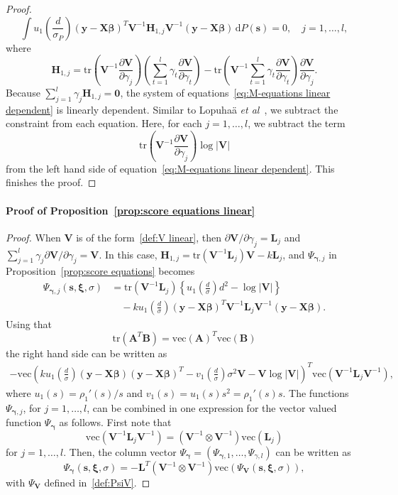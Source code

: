 \documentclass{article}
\numberwithin{equation}{section}
\theoremstyle{plain}
\newcommand{\dd}{\mathrm{d}}
\newcommand{\vc}{\mathrm{vec}}
\newcommand{\tr}{\mathrm{tr}}
\newcommand{\bbeta}{\bm\beta}
\newcommand{\bxi}{\bm\xi}
\newcommand{\bgamma}{\bm\gamma}
\newcommand{\by}{\mathbf{y}}
\newcommand{\bs}{\mathbf{s}}
\newcommand{\bX}{\mathbf{X}}
\newcommand{\bV}{\mathbf{V}}
\newcommand{\bA}{\mathbf{A}}
\newcommand{\bB}{\mathbf{B}}
\newcommand{\bL}{\mathbf{L}}
\newcommand{\bH}{\mathbf{H}}
\begin{document}
\begin{proof}
\begin{equation}
\int
u_1\left(\frac{d}{\sigma_P}\right)
(\by-\bX\bbeta)^T\bV^{-1}
\bH_{1,j}
\bV^{-1}(\by-\bX\bbeta)
\,\dd P(\mathbf{s})
=0,
\quad
j=1,\ldots,l,
\end{equation}
where
\[
\bH_{1,j}
=
\mathrm{tr}\left(\bV^{-1}\frac{\partial \bV}{\partial \gamma_j}\right)
\left(
\sum_{t=1}^l\gamma_t\frac{\partial \bV}{\partial \gamma_t}
\right)
-
\mathrm{tr}\left(\bV^{-1}\sum_{t=1}^l\gamma_t\frac{\partial \bV}{\partial \gamma_t}\right)
\frac{\partial \bV}{\partial \gamma_j}.
\]
Because $\sum_{j=1}^l \gamma_j\bH_{1,j}=\mathbf{0}$, the system of equations~\eqref{eq:M-equations linear dependent} is linearly dependent.
Similar to Lopuha\"a \textit{et al}~\cite{lopuhaa-gares-ruizgazen2023}, we subtract the constraint from each equation.
Here, for each $j=1,\ldots,l$, we subtract the term
\[
\mathrm{tr}\left(\bV^{-1}\frac{\partial \bV}{\partial \gamma_j}\right)
\log|\bV|
\]
from the left hand side of equation~\eqref{eq:M-equations linear dependent}.
This finishes the proof.
\end{proof}

\paragraph*{Proof of Proposition~\ref{prop:score equations linear}}
\begin{proof}
When $\bV$ is of the form~\eqref{def:V linear}, then $\partial\bV/\partial\gamma_j=\bL_j$
and $\sum_{j=1}^l\gamma_j \partial\bV/\partial\gamma_j=\bV$.
In this case, 
$\bH_{1,j}=
\mathrm{tr}\left(\bV^{-1}\bL_j\right)\bV
-
k\bL_j$,
and $\Psi_{\bgamma,j}$ in Proposition~\ref{prop:score equations} becomes
\[
\begin{split}
\Psi_{\bgamma,j}(\bs,\bxi,\sigma)
&=
\mathrm{tr}\left(\bV^{-1}\bL_j\right)
\left\{
u_1\left(\frac{d}{\sigma}\right)d^2-\log|\bV|
\right\}\\
&\quad
-
k
u_1\left(\frac{d}{\sigma}\right)
(\by-\bX\bbeta)^T\bV^{-1}
\bL_j
\bV^{-1}(\by-\bX\bbeta).
\end{split}
\]
Using that 
\begin{equation}
\label{eq:trace vec}
\tr(\bA^T\bB)=\vc(\bA)^T\vc(\bB)
\end{equation}
the right hand side can be written as
\[
\begin{split}
-\vc\left(
k
u_1\left(\frac{d}{\sigma}\right)
(\by-\bX\bbeta)(\by-\bX\bbeta)^T
-
v_1\left(\frac{d}{\sigma}\right)\sigma^2\bV
-
\bV\log|\bV|
\right)^T
\vc\left(
\bV^{-1}
\bL_j
\bV^{-1}
\right),
\end{split}
\]
where $u_1(s)=\rho_1'(s)/s$ and
$v_1(s)=u_1(s)s^2=\rho_1'(s)s$.
The functions $\Psi_{\bgamma,j}$, for $j=1,\ldots,l$, can be combined in one expression for the
vector valued function $\Psi_{\bgamma}$ as follows.
First note that
\[
\vc\left(
\bV^{-1}
\bL_j
\bV^{-1}
\right)
=
\left(
\bV^{-1}
\otimes
\bV^{-1}
\right)
\vc\left(
\bL_j
\right)
\]
for $j=1,\ldots,l$.
Then, the column vector $\Psi_{\bgamma}=(\Psi_{\bgamma,1},\ldots,\Psi_{\gamma,l})$ can be written as
\[
\Psi_{\bgamma}(\bs,\bxi,\sigma)
=
-\bL^T
\left(
\bV^{-1}
\otimes
\bV^{-1}
\right)
\vc\left(
\Psi_\bV(\bs,\bxi,\sigma)
\right),
\]
with $\Psi_{\bV}$ defined in~\eqref{def:PsiV}.
\end{proof}
\end{document}
